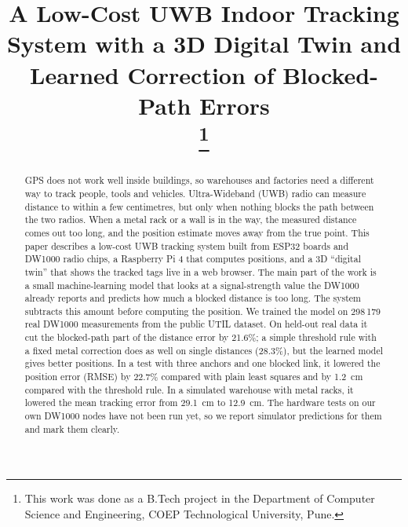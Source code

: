 \documentclass[conference]{IEEEtran}
\begin{document}
\title{A Low-Cost UWB Indoor Tracking System with a 3D Digital Twin and Learned Correction of Blocked-Path Errors\\
\thanks{This work was done as a B.Tech project in the Department of Computer Science and Engineering, COEP Technological University, Pune.}
}

\author{
}

\maketitle

\begin{abstract}
GPS does not work well inside buildings, so warehouses and factories need a
different way to track people, tools and vehicles. Ultra-Wideband (UWB)
radio can measure distance to within a few centimetres, but only when
nothing blocks the path between the two radios. When a metal rack or a wall
is in the way, the measured distance comes out too long, and the position
estimate moves away from the true point. This paper describes a low-cost
UWB tracking system built from ESP32 boards and DW1000 radio chips, a
Raspberry Pi 4 that computes positions, and a 3D ``digital twin'' that shows
the tracked tags live in a web browser. The main part of the work is a small
machine-learning model that looks at a signal-strength value the DW1000
already reports and predicts how much a blocked distance is too long. The
system subtracts this amount before computing the position. We trained the
model on 298\,179 real DW1000 measurements from the public UTIL dataset.
On held-out real data it cut the blocked-path part of the distance error by
21.6\%; a simple threshold rule with a fixed metal correction does as well on
single distances (28.3\%), but the learned model gives better positions. In a
test with three anchors and one blocked link, it lowered the position error
(RMSE) by 22.7\% compared with plain least squares and by 1.2~cm compared with
the threshold rule. In a simulated warehouse with metal racks, it lowered the
mean tracking error from 29.1~cm to 12.9~cm. The hardware tests on our own
DW1000 nodes have not been run yet, so we report simulator predictions for
them and mark them clearly.
\end{abstract}
\end{document}
